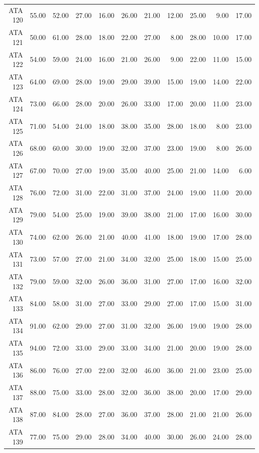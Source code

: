 \begin{landscape}
\begin{longtable}{rrrrrrrrrrr}
  ATA 120 & 55.00 & 52.00 & 27.00 & 16.00 & 26.00 & 21.00 & 12.00 & 25.00 & 9.00 & 17.00 \\ 
  ATA 121 & 50.00 & 61.00 & 28.00 & 18.00 & 22.00 & 27.00 & 8.00 & 28.00 & 10.00 & 17.00 \\ 
  ATA 122 & 54.00 & 59.00 & 24.00 & 16.00 & 21.00 & 26.00 & 9.00 & 22.00 & 11.00 & 15.00 \\ 
  ATA 123 & 64.00 & 69.00 & 28.00 & 19.00 & 29.00 & 39.00 & 15.00 & 19.00 & 14.00 & 22.00 \\ 
  ATA 124 & 73.00 & 66.00 & 28.00 & 20.00 & 26.00 & 33.00 & 17.00 & 20.00 & 11.00 & 23.00 \\ 
  ATA 125 & 71.00 & 54.00 & 24.00 & 18.00 & 38.00 & 35.00 & 28.00 & 18.00 & 8.00 & 23.00 \\ 
  ATA 126 & 68.00 & 60.00 & 30.00 & 19.00 & 32.00 & 37.00 & 23.00 & 19.00 & 8.00 & 26.00 \\ 
  ATA 127 & 67.00 & 70.00 & 27.00 & 19.00 & 35.00 & 40.00 & 25.00 & 21.00 & 14.00 & 6.00 \\ 
  ATA 128 & 76.00 & 72.00 & 31.00 & 22.00 & 31.00 & 37.00 & 24.00 & 19.00 & 11.00 & 20.00 \\ 
  ATA 129 & 79.00 & 54.00 & 25.00 & 19.00 & 39.00 & 38.00 & 21.00 & 17.00 & 16.00 & 30.00 \\ 
  ATA 130 & 74.00 & 62.00 & 26.00 & 21.00 & 40.00 & 41.00 & 18.00 & 19.00 & 17.00 & 28.00 \\ 
  ATA 131 & 73.00 & 57.00 & 27.00 & 21.00 & 34.00 & 32.00 & 25.00 & 18.00 & 15.00 & 25.00 \\ 
  ATA 132 & 79.00 & 59.00 & 32.00 & 26.00 & 36.00 & 31.00 & 27.00 & 17.00 & 16.00 & 32.00 \\ 
  ATA 133 & 84.00 & 58.00 & 31.00 & 27.00 & 33.00 & 29.00 & 27.00 & 17.00 & 15.00 & 31.00 \\ 
  ATA 134 & 91.00 & 62.00 & 29.00 & 27.00 & 31.00 & 32.00 & 26.00 & 19.00 & 19.00 & 28.00 \\ 
  ATA 135 & 94.00 & 72.00 & 33.00 & 29.00 & 33.00 & 34.00 & 21.00 & 20.00 & 19.00 & 28.00 \\ 
  ATA 136 & 86.00 & 76.00 & 27.00 & 22.00 & 32.00 & 46.00 & 36.00 & 21.00 & 23.00 & 25.00 \\ 
  ATA 137 & 88.00 & 75.00 & 33.00 & 28.00 & 32.00 & 36.00 & 38.00 & 20.00 & 17.00 & 29.00 \\ 
  ATA 138 & 87.00 & 84.00 & 28.00 & 27.00 & 36.00 & 37.00 & 28.00 & 21.00 & 21.00 & 26.00 \\ 
  ATA 139 & 77.00 & 75.00 & 29.00 & 28.00 & 34.00 & 40.00 & 30.00 & 26.00 & 24.00 & 28.00 \\ 

\end{longtable}
\end{landscape}
